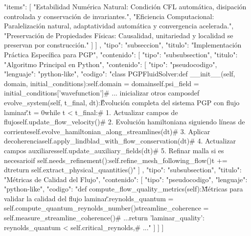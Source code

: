 \documentclass{article}
\begin{document}
{{{{              "items": [
                "Estabilidad Numérica Natural: Condición CFL automática, disipación controlada y conservación de invariantes.",
                "Eficiencia Computacional: Paralelización natural, adaptatividad automática y convergencia acelerada.",
                "Preservación de Propiedades Físicas: Causalidad, unitariedad y localidad se preservan por construcción."
              ]
            }
          ]
        },
        {
          "tipo": "subseccion",
          "titulo": "Implementación Práctica Específica para PGP",
          "contenido": [
            {
              "tipo": "subsubsection",
              "titulo": "Algoritmo Principal en Python",
              "contenido": [
                {
                  "tipo": "pseudocodigo",
                  "lenguaje": "python-like",
                  "codigo": "class PGPFluidSolver:\n    def __init__(self, domain, initial_conditions):\n        self.domain = domain\n        self.psi_field = initial_conditions['wavefunction']\n        # ... inicializar otros campos\n\n    def evolve_system(self, t_final, dt):\n        \"\"\"Evolución completa del sistema PGP con flujo laminar.\"\"\"\n        t = 0\n        while t < t_final:\n            # 1. Actualizar campos de flujo\n            self.update_flow_velocity()\n            # 2. Evolución hamiltoniana siguiendo líneas de corriente\n            self.evolve_hamiltonian_along_streamlines(dt)\n            # 3. Aplicar decoherencia\n            self.apply_lindblad_with_flow_conservation(dt)\n            # 4. Actualizar campos auxiliares\n            self.update_auxiliary_fields(dt)\n            # 5. Refinar malla si es necesario\n            if self.needs_refinement():\n                self.refine_mesh_following_flow()\n            t += dt\n        return self.extract_physical_quantities()"
                }
              ]
            },
            {
              "tipo": "subsubsection",
              "titulo": "Métricas de Calidad del Flujo",
              "contenido": [
                {
                  "tipo": "pseudocodigo",
                  "lenguaje": "python-like",
                  "codigo": "def compute_flow_quality_metrics(self):\n    \"\"\"Métricas para validar la calidad del flujo laminar.\"\"\"\n    reynolds_quantum = self.compute_quantum_reynolds_number()\n    streamline_coherence = self.measure_streamline_coherence()\n    # ...\n    return {\n        'laminar_quality': reynolds_quantum < self.critical_reynolds,\n        # ...\n    }"
                }
              ]
            }
          ]
        }
      ]
}}
\end{document}
